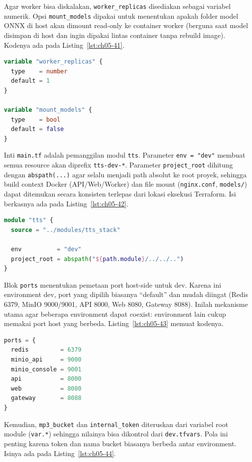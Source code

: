 Agar worker bisa diskalakan, \texttt{worker\_replicas} disediakan sebagai variabel numerik. Opsi \texttt{mount\_models} dipakai untuk menentukan apakah folder model ONNX di host akan dimount read-only ke container worker (berguna saat model disimpan di host dan ingin dipakai lintas container tanpa rebuild image). Kodenya ada pada Listing~\ref{lst:ch05-41}.

\begin{lstlisting}[language=terraform, caption={Potongan kode Terraform pada main.tf (7)}, label={lst:ch05-41}]
variable "worker_replicas" {
  type    = number
  default = 1
}

variable "mount_models" {
  type    = bool
  default = false
}
\end{lstlisting}

Inti \texttt{main.tf} adalah pemanggilan modul \texttt{tts}. Parameter \texttt{env = "dev"} membuat semua resource akan diprefix \texttt{tts-dev-*}. Parameter \texttt{project\_root} dihitung dengan \texttt{abspath(...)} agar selalu menjadi path absolut ke root proyek, sehingga build context Docker (API/Web/Worker) dan file mount (\texttt{nginx.conf}, \texttt{models/}) dapat ditemukan secara konsisten terlepas dari lokasi eksekusi Terraform. Isi berkasnya ada pada Listing~\ref{lst:ch05-42}.

\begin{lstlisting}[language=terraform, caption={Potongan awal main.tf}, label={lst:ch05-42}]
module "tts" {
  source = "../modules/tts_stack"

  env          = "dev"
  project_root = abspath("${path.module}/../../..")
}
\end{lstlisting}

Blok \texttt{ports} menentukan pemetaan port host-side untuk dev. Karena ini environment dev, port yang dipilih biasanya ``default'' dan mudah diingat (Redis 6379, MinIO 9000/9001, API 8000, Web 8080, Gateway 8088). Inilah mekanisme utama agar beberapa environment dapat coexist: environment lain cukup memakai port host yang berbeda. Listing~\ref{lst:ch05-43} memuat kodenya.

\begin{lstlisting}[language=terraform, caption={Potongan kode Terraform pada main.tf (8)}, label={lst:ch05-43}]
ports = {
  redis         = 6379
  minio_api     = 9000
  minio_console = 9001
  api           = 8000
  web           = 8080
  gateway       = 8088
}
\end{lstlisting}

Kemudian, \texttt{mp3\_bucket} dan \texttt{internal\_token} diteruskan dari variabel root module (\texttt{var.*}) sehingga nilainya bisa dikontrol dari \texttt{dev.tfvars}. Pola ini penting karena token dan nama bucket biasanya berbeda antar environment. Isinya ada pada Listing~\ref{lst:ch05-44}.

